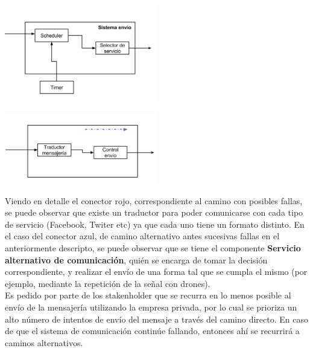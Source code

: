 \documentclass[a4paper, 11pt]{article}
\begin{document}
\centerline{\includegraphics[width=0.5\textwidth]{./diagramas/ArqTP2conector1.png}}
\centerline{\includegraphics[width=0.5\textwidth]{./diagramas/ArqTP2conector2.png}}

Viendo en detalle el conector rojo, correspondiente al camino con posibles fallas, se puede observar que existe un traductor para poder comunicarse con cada tipo de servicio (Facebook, Twiter etc) ya que cada uno tiene un formato distinto.
En el caso del conector azul, de camino alternativo antes sucesivas fallas en el anteriormente descripto, se puede observar que se tiene el componente \textbf{Servicio alternativo de comunicación}, quién se encarga de tomar la decisión correspondiente, y realizar el envío de una forma tal que se cumpla el mismo (por ejemplo, mediante la repetición de la señal con drones).\\


Es pedido por parte de los stakenholder que se recurra en lo menos posible al envío de la mensajería utilizando la empresa privada, por lo cual se prioriza un alto número de intentos de envío del mensaje a través del camino directo. En caso de que el sistema de comunicación continúe fallando, entonces ahí se recurrirá a caminos alternativos. \\
\end{document}
